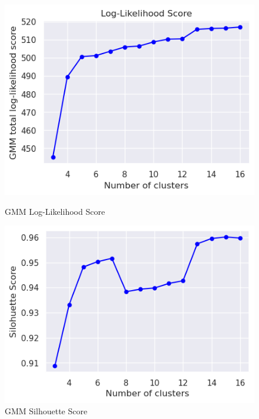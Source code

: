         
        \begin{figure}[h]
            \centering
            \begin{minipage}[c]{0.47\textwidth}
                \centering
                \includegraphics[width=\textwidth]{../figures/plots/section3/gmm_total_log-likelihood_score.png}
                \caption{GMM Log-Likelihood Score}
                \label{fig:gmm_log_likelihood}
            \end{minipage}
            \hfill
            \begin{minipage}[c]{0.47\textwidth}
                \centering
                \includegraphics[width=\textwidth]{../figures/plots/section3/gmm_silohuette_score.png}
                \caption{GMM Silhouette Score}
                \label{fig:gmm_silhouette_score}
            \end{minipage}
        \end{figure}

